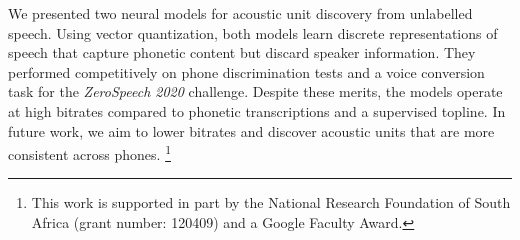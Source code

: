 \documentclass[a4paper]{article}
\newcommand\blfootnote[1]{\begingroup
                          \renewcommand\thefootnote{}\footnote{#1}
                          \addtocounter{footnote}{-1}
                          \endgroup}
\begin{document}
We presented two neural models for acoustic unit discovery from unlabelled speech.
Using vector quantization, both models learn discrete representations of speech that capture phonetic content but discard speaker information.
They performed competitively on phone discrimination tests and a voice conversion task for the \textit{ZeroSpeech 2020} challenge.
Despite these merits, the models operate at high bitrates compared to phonetic transcriptions and a supervised topline.
In future work, we aim to lower bitrates and discover acoustic units that are more consistent across phones.\blfootnote{This work is supported in part by the National Research Foundation of South Africa (grant number: 120409) and a Google Faculty Award.}  

\newpage

\end{document}
